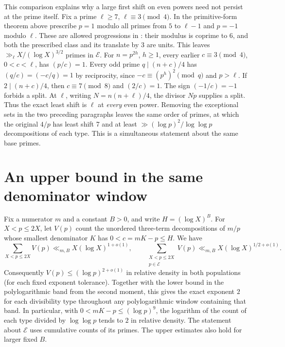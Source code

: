 \documentclass[a4paper,11pt]{article}
\begin{document}
This comparison explains why a large first shift on even powers need not persist at the prime itself. Fix a prime $\ell\ge7$, $\ell\equiv3\pmod4$. In the primitive-form theorem above prescribe $p=1$ modulo all primes from $5$ to $\ell-1$ and $p=-1$ modulo $\ell$. These are allowed progressions in \cite[Theorem 1.1(2)]{forms}: their modulus is coprime to 6, and both the prescribed class and its translate by 3 are units. This leaves $\gg_\ell X/(\log X)^{3/2}$ primes in $\mathcal E$. For $n=p^{2h}$, $h\ge1$, every earlier $c\equiv3\pmod4$, $0<c<\ell$, has $(p/c)=1$. Every odd prime $q\mid(n+c)/4$ has $(q/c)=(-c/q)=1$ by reciprocity, since $-c\equiv(p^h)^2\pmod q$ and $p>\ell$. If $2\mid(n+c)/4$, then $c\equiv7\pmod8$ and $(2/c)=1$. The sign $(-1/c)=-1$ forbids a split. At $\ell$, writing $N=n(n+\ell)/4$, the divisor $Np$ supplies a split. Thus the exact least shift is $\ell$ at \emph{every} even power. Removing the exceptional sets in the two preceding paragraphs leaves the same order of primes, at which the original $4/p$ has least shift 7 and at least $\gg(\log p)^2/\log\log p$ decompositions of each type. This is a simultaneous statement about the same base primes.


\section{An upper bound in the same denominator window}
\label{sec:windowupper}
Fix a numerator $m$ and a constant $B>0$, and write $H=(\log X)^B$.
For $X<p\le 2X$, let $V(p)$ count the unordered three-term
decompositions of $m/p$ whose smallest denominator $K$ has
$0<c=mK-p\le H$. We have
\[
 \sum_{X<p\le 2X}V(p)\ll_{m,B}X(\log X)^{1+o(1)},\qquad
 \sum_{\substack{X<p\le 2X\\p\in\mathcal E}}V(p)
     \ll_{m,B}X(\log X)^{1/2+o(1)}.
\]
Consequently $V(p)\le(\log p)^{2+o(1)}$ in relative density in both populations (for each fixed exponent tolerance). Together with the lower bound
in the polylogarithmic band from the second moment, this gives the
exact exponent $2$ for each divisibility type throughout any
polylogarithmic window containing that band. In particular, with $0<mK-p\le(\log p)^9$, the logarithm of the count of each type divided by $\log\log p$ tends to $2$ in relative density. The statement about $\mathcal E$ uses cumulative counts of its primes. The upper estimates also
hold for larger fixed $B$.
\end{document}
